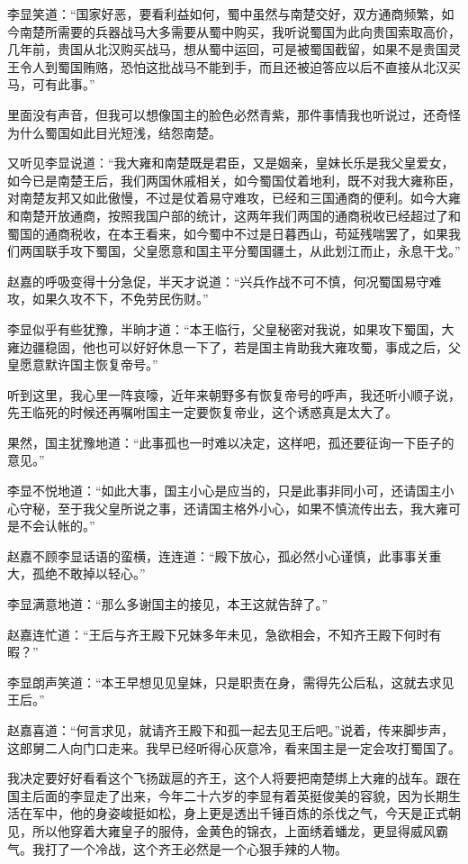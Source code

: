 李显笑道：“国家好恶，要看利益如何，蜀中虽然与南楚交好，双方通商频繁，如今南楚所需要的兵器战马大多需要从蜀中购买，我听说蜀国为此向贵国索取高价，几年前，贵国从北汉购买战马，想从蜀中运回，可是被蜀国截留，如果不是贵国灵王令人到蜀国贿赂，恐怕这批战马不能到手，而且还被迫答应以后不直接从北汉买马，可有此事。”

里面没有声音，但我可以想像国主的脸色必然青紫，那件事情我也听说过，还奇怪为什么蜀国如此目光短浅，结怨南楚。

又听见李显说道：“我大雍和南楚既是君臣，又是姻亲，皇妹长乐是我父皇爱女，如今已是南楚王后，我们两国休戚相关，如今蜀国仗着地利，既不对我大雍称臣，对南楚友邦又如此傲慢，不过是仗着易守难攻，已经和三国通商的便利。如今大雍和南楚开放通商，按照我国户部的统计，这两年我们两国的通商税收已经超过了和蜀国的通商税收，在本王看来，如今蜀中不过是日暮西山，苟延残喘罢了，如果我们两国联手攻下蜀国，父皇愿意和国主平分蜀国疆土，从此划江而止，永息干戈。”

赵嘉的呼吸变得十分急促，半天才说道：“兴兵作战不可不慎，何况蜀国易守难攻，如果久攻不下，不免劳民伤财。”

李显似乎有些犹豫，半晌才道：“本王临行，父皇秘密对我说，如果攻下蜀国，大雍边疆稳固，他也可以好好休息一下了，若是国主肯助我大雍攻蜀，事成之后，父皇愿意默许国主恢复帝号。”

听到这里，我心里一阵哀嚎，近年来朝野多有恢复帝号的呼声，我还听小顺子说，先王临死的时候还再嘱咐国主一定要恢复帝业，这个诱惑真是太大了。

果然，国主犹豫地道：“此事孤也一时难以决定，这样吧，孤还要征询一下臣子的意见。”

李显不悦地道：“如此大事，国主小心是应当的，只是此事非同小可，还请国主小心守秘，至于我父皇所说之事，还请国主格外小心，如果不慎流传出去，我大雍可是不会认帐的。”

赵嘉不顾李显话语的蛮横，连连道：“殿下放心，孤必然小心谨慎，此事事关重大，孤绝不敢掉以轻心。”

李显满意地道：“那么多谢国主的接见，本王这就告辞了。”

赵嘉连忙道：“王后与齐王殿下兄妹多年未见，急欲相会，不知齐王殿下何时有暇？”

李显朗声笑道：“本王早想见见皇妹，只是职责在身，需得先公后私，这就去求见王后。”

赵嘉喜道：“何言求见，就请齐王殿下和孤一起去见王后吧。”说着，传来脚步声，这郎舅二人向门口走来。我早已经听得心灰意冷，看来国主是一定会攻打蜀国了。

我决定要好好看看这个飞扬跋扈的齐王，这个人将要把南楚绑上大雍的战车。跟在国主后面的李显走了出来，今年二十六岁的李显有着英挺俊美的容貌，因为长期生活在军中，他的身姿峻挺如松，身上更是透出千锤百炼的杀伐之气，今天是正式朝见，所以他穿着大雍皇子的服侍，金黄色的锦衣，上面绣着蟠龙，更显得威风霸气。我打了一个冷战，这个齐王必然是一个心狠手辣的人物。

